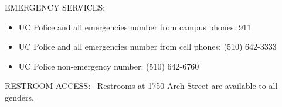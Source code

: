 \documentclass[letterpaper]{inzane_syllabus} %
\begin{document}
EMERGENCY SERVICES:
\begin{itemize}
\item UC Police and all emergencies number from campus phones: 911
\item UC Police and all emergencies number from cell phones: (510) 642-3333
\item UC Police non-emergency number: (510) 642-6760
\end{itemize}
RESTROOM ACCESS: 
Restrooms at 1750 Arch Street are available to all genders.
\end{document}
